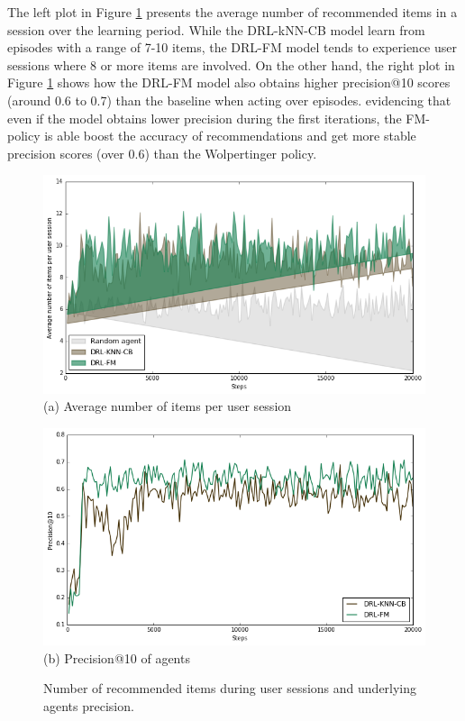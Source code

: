 The left plot in Figure \ref{fig:precision_att} presents the average number of recommended items in a session over the learning period. While the DRL-kNN-CB model learn from episodes with a range of 7-10 items, the DRL-FM model tends to experience user sessions where 8 or more items are involved. On the other hand, the right plot in Figure \ref{fig:precision_att} shows how the DRL-FM model also obtains higher precision@10 scores (around 0.6 to 0.7) than the baseline when acting over episodes. evidencing that even if the model obtains lower precision during the first iterations, the FM-policy is able boost the accuracy of recommendations and get more stable precision scores (over 0.6) than the Wolpertinger policy.

\begin{figure}[t]\centering
   \begin{minipage}{0.49\textwidth}
     \centering
     \includegraphics[width=\linewidth]{images/itemspersession}
     \centering \small (a) Average number of items per user session
   \end{minipage}
   \begin {minipage}{0.49\textwidth}
   \centering
    \includegraphics[width=\linewidth]{images/precision_at_10}
     \small (b) Precision@10 of agents
   \end{minipage}
    \caption{\small Number of recommended items during user sessions and underlying agents precision.}
      \label{fig:precision_att}
\end{figure}

